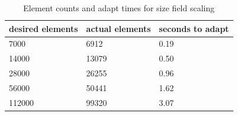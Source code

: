 \begin{table}
\caption{Element counts and adapt times for size field scaling}
\label{tab:scale}
\begin{center}
\begin{tabular}{l|l|l}
desired elements & actual elements & seconds to adapt \\ \hline
7000   & 6912  & 0.19 \\
14000  & 13079 & 0.50 \\
28000  & 26255 & 0.96 \\
56000  & 50441 & 1.62 \\
112000 & 99320 & 3.07 \\
\end{tabular}
\end{center}
\end{table}



